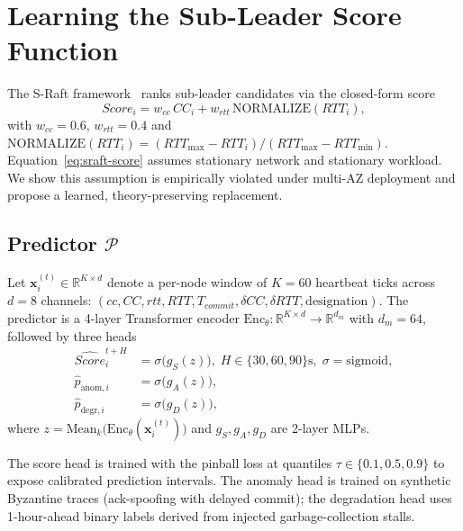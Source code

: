 
\section{Learning the Sub-Leader Score Function}
\label{sec:learn-score}

The S-Raft framework~\cite{Sraft2026} ranks sub-leader candidates via
the closed-form score
\begin{equation}
  \label{eq:sraft-score}
  Score_i = w_{cc}\, CC_i + w_{rtt}\, \mathrm{NORMALIZE}(RTT_i),
\end{equation}
with $w_{cc}=0.6$, $w_{rtt}=0.4$ and
$\mathrm{NORMALIZE}(RTT_i)=(RTT_{\max}-RTT_i)/(RTT_{\max}-RTT_{\min})$.
Equation~\eqref{eq:sraft-score} assumes stationary network and stationary
workload. We show this assumption is empirically violated under multi-AZ
deployment and propose a learned, theory-preserving replacement.

\subsection{Predictor $\mathcal{P}$}
\label{sec:predictor}

Let $\mathbf{x}_i^{(t)}\in\mathbb{R}^{K\times d}$ denote a per-node window
of $K=60$ heartbeat ticks across $d=8$ channels:
$(cc, CC, rtt, RTT, T_{commit}, \delta CC, \delta RTT, \text{designation})$.
The predictor is a 4-layer Transformer encoder
$\mathrm{Enc}_\theta:\mathbb{R}^{K\times d}\!\to\!\mathbb{R}^{d_m}$ with
$d_m{=}64$, followed by three heads
\begin{align}
  \widehat{Score}_i^{t+H} &= \sigma\bigl(g_S(z)\bigr),\;
    H\in\{30,60,90\}\text{s},\;\sigma\!=\!\mathrm{sigmoid},\\
  \widehat{p}_{\mathrm{anom},i} &= \sigma\bigl(g_A(z)\bigr),\\
  \widehat{p}_{\mathrm{degr},i} &= \sigma\bigl(g_D(z)\bigr),
\end{align}
where $z=\mathrm{Mean}_k\!\bigl(\mathrm{Enc}_\theta(\mathbf{x}_i^{(t)})\bigr)$ and
$g_S,g_A,g_D$ are 2-layer MLPs.

The score head is trained with the pinball loss at quantiles
$\tau\in\{0.1,0.5,0.9\}$ to expose calibrated prediction intervals. The
anomaly head is trained on synthetic Byzantine traces (ack-spoofing with
delayed commit); the degradation head uses 1-hour-ahead binary labels
derived from injected garbage-collection stalls.

